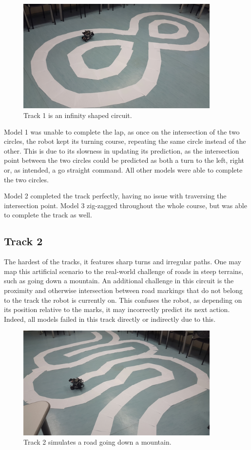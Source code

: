 \begin{figure}[h]
  \centering\includegraphics[width=0.9\textwidth]{imgs/track_1.png}
  \caption{Track 1 is an infinity shaped circuit.}
\end{figure}

Model 1 was unable to complete the lap, as once on the intersection of the two circles, the robot
kept its turning course, repeating the same circle instead of the other. This is due to its
slowness in updating its prediction, as the intersection point between the two circles could be
predicted as both a turn to the left, right or, as intended, a go straight command. All other
models were able to complete the two circles.

Model 2 completed the track perfectly, having no issue with traversing the intersection point.
Model 3 zig-zagged throughout the whole course, but was able to complete the track as well.

\subsection{Track 2}

The hardest of the tracks, it features sharp turns and irregular paths. One may map this artificial
scenario to the real-world challenge of roads in steep terrains, such as going down a mountain. An
additional challenge in this circuit is the proximity and otherwise intersection between road
markings that do not belong to the track the robot is currently on. This confuses the robot, as
depending on its position relative to the marks, it may incorrectly predict its next action.
Indeed, all models failed in this track directly or indirectly due to this.

\begin{figure}[h]
  \centering\includegraphics[width=0.9\textwidth]{imgs/track_2.png}
  \caption{Track 2 simulates a road going down a mountain.}
\end{figure}

